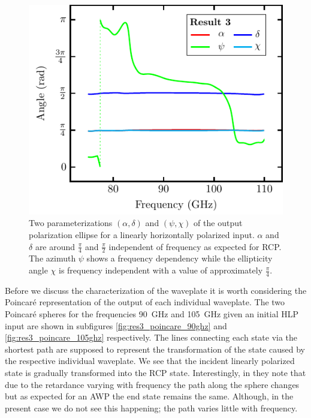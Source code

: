 \begin{figure}[H]
    \centering
    \includegraphics[scale=0.7]{images/results/plots/polymer/params_dotted.pdf}
    \caption{Two parameterizations $(\alpha, \delta)$ and $(\psi, \chi)$ of the output polarization ellipse for a linearly horizontally polarized input. $\alpha$ and $\delta$ are around $\frac{\pi}{4}$ and $\frac{\pi}{2}$ independent of frequency as expected for RCP. The azimuth $\psi$ shows a frequency dependency while the ellipticity angle $\chi$ is frequency independent with a value of approximately $\frac{\pi}{4}$.}
    \label{fig:polymer_params_dotted}
\end{figure}

Before we discuss the characterization of the waveplate it is worth considering the Poincaré representation of the output of each individual waveplate. The two Poincaré spheres for the frequencies \SI{90}{\giga \hertz} and \SI{105}{\giga \hertz} given an initial HLP input are shown in subfigures \ref{fig:res3_poincare_90ghz} and \ref{fig:res3_poincare_105ghz} respectively. The lines connecting each state via the shortest path are supposed to represent the transformation of the state caused by the respective individual waveplate. We see that the incident linearly polarized state is gradually transformed into the RCP state. Interestingly, in \cite{Masson2006} they note that due to the retardance varying with frequency the path along the sphere changes but as expected for an AWP the end state remains the same. Although, in the present case we do not see this happening; the path varies little with frequency. 

